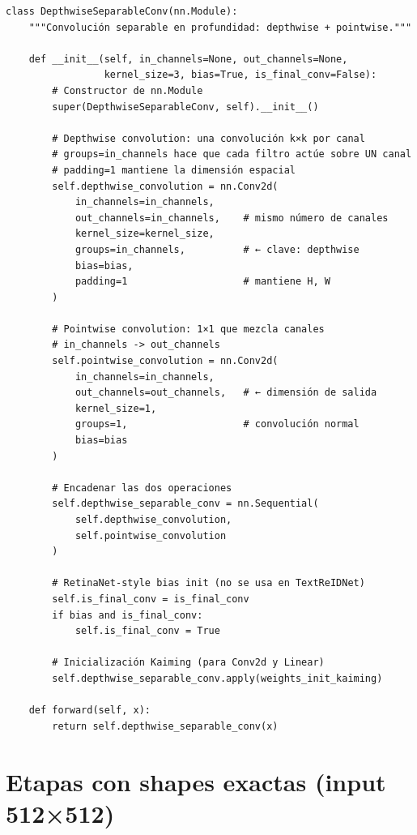 \begin{verbatim}
class DepthwiseSeparableConv(nn.Module):
    """Convolución separable en profundidad: depthwise + pointwise."""

    def __init__(self, in_channels=None, out_channels=None,
                 kernel_size=3, bias=True, is_final_conv=False):
        # Constructor de nn.Module
        super(DepthwiseSeparableConv, self).__init__()

        # Depthwise convolution: una convolución k×k por canal
        # groups=in_channels hace que cada filtro actúe sobre UN canal
        # padding=1 mantiene la dimensión espacial
        self.depthwise_convolution = nn.Conv2d(
            in_channels=in_channels,
            out_channels=in_channels,    # mismo número de canales
            kernel_size=kernel_size,
            groups=in_channels,          # ← clave: depthwise
            bias=bias,
            padding=1                    # mantiene H, W
        )

        # Pointwise convolution: 1×1 que mezcla canales
        # in_channels -> out_channels
        self.pointwise_convolution = nn.Conv2d(
            in_channels=in_channels,
            out_channels=out_channels,   # ← dimensión de salida
            kernel_size=1,
            groups=1,                    # convolución normal
            bias=bias
        )

        # Encadenar las dos operaciones
        self.depthwise_separable_conv = nn.Sequential(
            self.depthwise_convolution,
            self.pointwise_convolution
        )

        # RetinaNet-style bias init (no se usa en TextReIDNet)
        self.is_final_conv = is_final_conv
        if bias and is_final_conv:
            self.is_final_conv = True

        # Inicialización Kaiming (para Conv2d y Linear)
        self.depthwise_separable_conv.apply(weights_init_kaiming)

    def forward(self, x):
        return self.depthwise_separable_conv(x)
\end{verbatim}

\section{Etapas con shapes exactas (input 512×512)}

